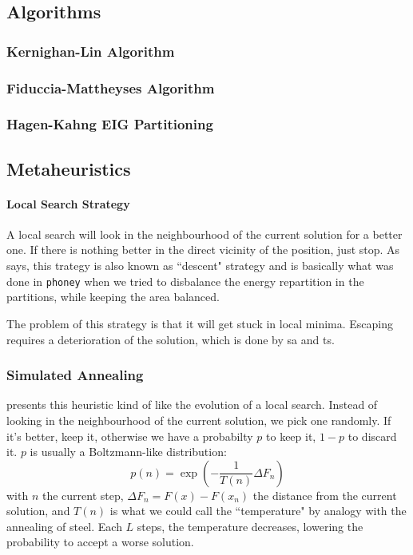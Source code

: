 \documentclass[12pt,a4paper]{article}
\begin{document}
\subsection{Algorithms}
\cite{SungKyuLim:ECE6133:partitioning}
\subsubsection{Kernighan-Lin Algorithm}

\subsubsection{Fiduccia-Mattheyses Algorithm}

\subsubsection{Hagen-Kahng EIG Partitioning}

\subsection{Metaheuristics}

\paragraph{Local Search Strategy}
A local search will look in the neighbourhood of the current solution for a better one.
If there is nothing better in the direct vicinity of the position, just stop.
As \cite{Pirlot1996} says, this trategy is also known as ``descent" strategy and is basically what was done in \texttt{phoney} when we tried to disbalance the energy repartition in the partitions, while keeping the area balanced.

The problem of this strategy is that it will get stuck in local minima.
Escaping requires a deterioration of the solution, which is done by \gls{sa} and \gls{ts}.

\subsubsection{Simulated Annealing}
\cite{Pirlot1996} presents this heuristic kind of like the evolution of a local search.
Instead of looking in the neighbourhood of the current solution, we pick one randomly.
If it's better, keep it, otherwise we have a probabilty $p$ to keep it, $1-p$ to discard it.
$p$ is usually a Boltzmann-like distribution:
\[p(n) = \exp{\left(-\frac{1}{T(n)} \Delta F_n\right)}\]
with $n$ the current step, $\Delta F_n = F(x) - F(x_n)$ the distance from the current solution, and $T(n)$ is what we could call the ``temperature" by analogy with the annealing of steel.
Each $L$ steps, the temperature decreases, lowering the probability to accept a worse solution.
\end{document}
